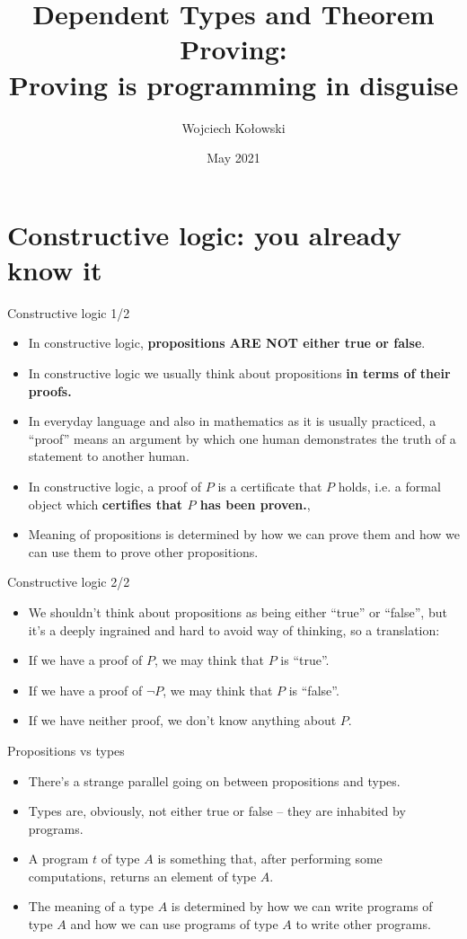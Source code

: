 \documentclass{beamer}
\title{Dependent Types and Theorem Proving: \\Proving is programming in disguise}
\author{Wojciech Kołowski}
\date{May 2021}
\begin{document}
\section{Constructive logic: you already know it}

\begin{frame}{Constructive logic 1/2}
\begin{itemize}
	\item In constructive logic, \textbf{propositions ARE NOT either true or false}.
	\item In constructive logic we usually think about propositions \textbf{in terms of their proofs.}
	\item In everyday language and also in mathematics as it is usually practiced, a ``proof'' means an argument by which one human demonstrates the truth of a statement to another human.
	\item In constructive logic, a proof of $P$ is a certificate that $P$ holds, i.e. a formal object which \textbf{certifies that $P$ has been proven.},
	\item Meaning of propositions is determined by how we can prove them and how we can use them to prove other propositions.
\end{itemize}
\end{frame}

\begin{frame}{Constructive logic 2/2}
\begin{itemize}
	\item We shouldn't think about propositions as being either ``true'' or ``false'', but it's a deeply ingrained and hard to avoid way of thinking, so a translation:
	\item If we have a proof of $P$, we may think that $P$ is ``true''.
	\item If we have a proof of $\neg P$, we may think that $P$ is ``false''.
	\item If we have neither proof, we don't know anything about $P$.
\end{itemize}
\end{frame}

\begin{frame}{Propositions vs types}
\begin{itemize}
	\item There's a strange parallel going on between propositions and types.
	\item Types are, obviously, not either true or false -- they are inhabited by programs.
	\item A program $t$ of type $A$ is something that, after performing some computations, returns an element of type $A$.
	\item The meaning of a type $A$ is determined by how we can write programs of type $A$ and how we can use programs of type $A$ to write other programs.
\end{itemize}
\end{frame}
\end{document}
